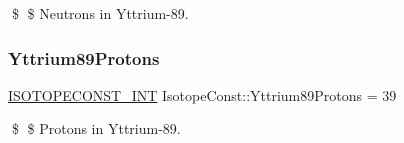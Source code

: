 \$ \$ Neutrons in Yttrium-\/89. \mbox{\label{group___isotope_const-_yttrium-_y89_gac3ea74b9f836a042c6107b9ff23c240e}} 
\subsubsection{\texorpdfstring{Yttrium89\+Protons}{Yttrium89Protons}}
{\footnotesize\ttfamily \mbox{\hyperlink{group___isotope_const-_macros_ga5f18360b3e99483a35c32d789e62621c}{I\+S\+O\+T\+O\+P\+E\+C\+O\+N\+S\+T\+\_\+\+I\+NT}} Isotope\+Const\+::\+Yttrium89\+Protons = 39}

\$ \$ Protons in Yttrium-\/89. 